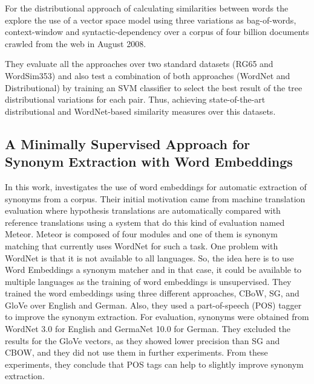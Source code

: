 For the distributional approach of calculating similarities between words the explore the use of a vector space model using three variations as bag-of-words, context-window and syntactic-dependency over a corpus of four billion documents crawled from the web in August 2008.

They evaluate all the approaches over two standard datasets (RG65 and WordSim353) and also test a combination of both approaches (WordNet and Distributional) by training an SVM classifier to select the best result of the tree distributional variations for each pair. Thus, achieving state-of-the-art distributional and WordNet-based similarity measures over this datasets.

\subsection{A Minimally Supervised Approach for Synonym Extraction with Word Embeddings}


In this work,  investigates the use of word embeddings for automatic extraction of synonyms from a corpus. Their initial motivation came from machine translation evaluation where hypothesis translations are automatically compared with reference translations using a system that do this kind of evaluation named Meteor. Meteor is composed of four modules and one of them is synonym matching that currently uses WordNet for such a task. One problem with WordNet is that it is not available to all languages. So, the idea here is to use Word Embeddings a synonym matcher and in that case, it could be available to multiple languages as the training of word embeddings is unsupervised.
They trained the word embeddings using three different approaches, CBoW, SG, and GloVe over English and German.  Also, they used a part-of-speech (POS) tagger to improve the synonym extraction. For evaluation, synonyms were obtained from WordNet 3.0 for English and GermaNet 10.0 for German.
They excluded the results for the GloVe vectors, as they showed lower precision than SG and CBOW, and they did not use them in further experiments.
From these experiments, they conclude that POS tags can help to slightly improve synonym extraction.



